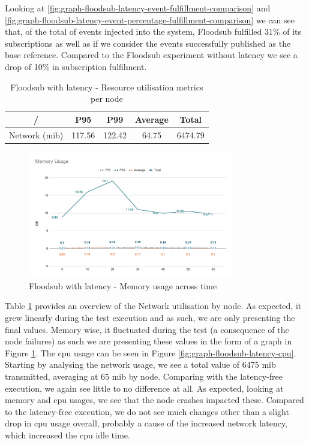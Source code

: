 Looking at \ref{fig:graph-floodsub-latency-event-fulfillment-comparison} and
\ref{fig:graph-floodsub-latency-event-percentage-fulfillment-comparison} we can
see that, of the total of events injected into the system, Floodsub fulfilled
31\% of its subscriptions as well as if we consider the events successfully
published as the base reference. Compared to the Floodsub experiment without
latency we see a drop of 10\% in subscription fulfilment.

\begin{table}[!htb]
\caption{Floodsub with latency - Resource utilisation metrics per node}
\label{table:floodsub-latency}
  \begin{center}
   \begin{tabular}{|c| c c c c|} 
   \hline
   / & P95 & P99 & Average & Total \\ [0.5ex] 
   \hline\hline
   Network (\acrshort{mib}) & 117.56 & 122.42 & 64.75 & 6474.79 \\
   \hline
  \end{tabular}
  \end{center}
\end{table}

\begin{figure}[!htb]
  \centering
  \includegraphics[width=0.8\textwidth]{../images/graph-floodsub-latency-memory.png}
  \caption{Floodsub with latency - Memory usage across time}
  \label{fig:graph-floodsub-latency-memory}
\end{figure}

Table \ref{table:floodsub-latency} provides an overview of the Network
utilisation by node. As expected, it grew linearly during the test execution
and as such, we are only presenting the final values. Memory wise, it
fluctuated during the test (a consequence of the node failures) as such we are
presenting these values in the form of a graph in Figure
\ref{fig:graph-floodsub-latency-memory}.  The \acrshort{cpu} usage can be seen
in Figure \ref{fig:graph-floodsub-latency-cpu}. Starting by analysing the network
usage, we see a total value of 6475 \acrshort{mib} transmitted, averaging at 65
\acrshort{mib} by node.  Comparing with the latency-free execution, we again
see little to no difference at all. As expected, looking at memory and
\acrshort{cpu} usages, we see that the node crashes impacted these. Compared to
the latency-free execution, we do not see much changes other than a slight drop
in \acrshort{cpu} usage overall, probably a cause of the increased network
latency, which increased the \acrshort{cpu} idle time.

